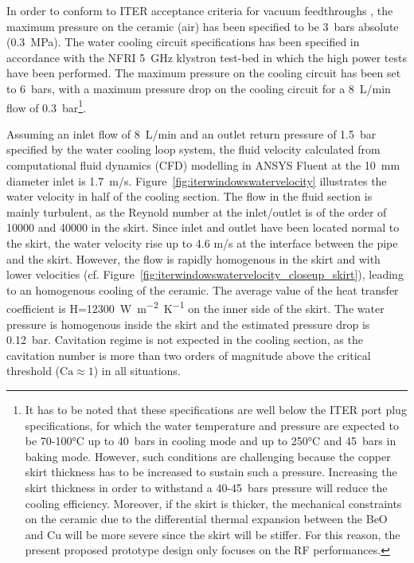 In order to conform to ITER acceptance criteria for vacuum feedthroughs , the maximum pressure on the ceramic (air) has been specified to be 3~bars absolute (0.3~MPa). The water cooling circuit specifications has been specified in accordance with the NFRI 5~GHz klystron test-bed in which the high power tests have been performed. The maximum pressure on the cooling circuit has been set to 6~bars, with a maximum pressure drop on the cooling circuit for a 8~L/min flow of 0.3~bar\footnote{It has to be noted that these specifications are well below the ITER port plug specifications, for which the water temperature and pressure are expected to be 70-100$\si{\celsius}$ up to 40~bars in cooling mode and up to 250$\si{\celsius}$ and 45~bars in baking mode. However, such conditions are challenging because the copper skirt thickness has to be increased to sustain such a pressure. Increasing the skirt thickness in order to withstand a 40-45~bars pressure will reduce the cooling efficiency. Moreover, if the skirt is thicker, the mechanical constraints on the ceramic due to the differential thermal expansion between the BeO and Cu will be more severe since the skirt will be stiffer. For this reason, the present proposed prototype design only focuses on the RF performances.}. 

Assuming an inlet flow of 8~L/min and an outlet return pressure of 1.5~bar specified by the water cooling loop system, the fluid velocity calculated from computational fluid dynamics (CFD) modelling in ANSYS Fluent at the 10~mm diameter inlet is 1.7~m/s. Figure~\ref{fig:iterwindowswatervelocity} illustrates the water velocity in half of the cooling section. The flow in the fluid section is mainly turbulent, as the Reynold number at the inlet/outlet is of the order of 10000 and 40000 in the skirt. Since inlet and outlet have been located normal to the skirt, the water velocity rise up to 4.6 m/s at the interface between the pipe and the skirt. However, the flow is rapidly homogenous in the skirt and with lower velocities (cf. Figure~\ref{fig:iterwindowswatervelocity_closeup_skirt}), leading to an homogenous cooling of the ceramic. The average value of the heat transfer coefficient is H=12300~\si{W.m^{-2}K^{-1}} on the inner side of the skirt. The water pressure is homogenous inside the skirt and the estimated pressure drop is 0.12~bar. Cavitation regime is not expected in the cooling section, as the cavitation number is more than two orders of magnitude above the critical threshold ($\mathrm{Ca}\approx 1$) in all situations.

